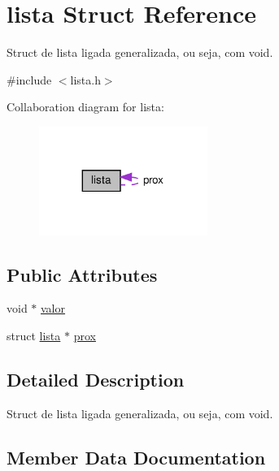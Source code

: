 \hypertarget{structlista}{}\section{lista Struct Reference}
\label{structlista}


Struct de lista ligada generalizada, ou seja, com void.  




{\ttfamily \#include $<$lista.\+h$>$}



Collaboration diagram for lista\+:\nopagebreak
\begin{figure}[H]
\begin{center}
\leavevmode
\includegraphics[width=155pt]{structlista__coll__graph}
\end{center}
\end{figure}
\subsection*{Public Attributes}
\begin{DoxyCompactItemize}
\item 
void $\ast$ \hyperlink{structlista_a1851230b0237deef0519ee33de9f2dd0}{valor}
\item 
struct \hyperlink{structlista}{lista} $\ast$ \hyperlink{structlista_a3b0e375147c1163d74544fd206a1f1de}{prox}
\end{DoxyCompactItemize}


\subsection{Detailed Description}
Struct de lista ligada generalizada, ou seja, com void. 

\subsection{Member Data Documentation}
\mbox{\label{structlista_a3b0e375147c1163d74544fd206a1f1de}} 
